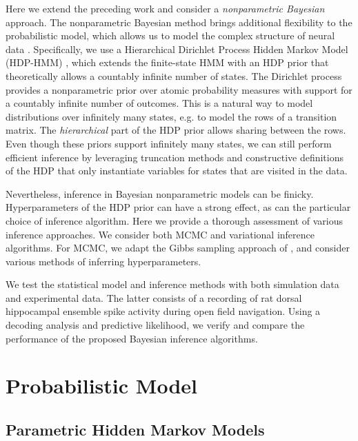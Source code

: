 Here we extend the preceding work and consider a {\em nonparametric
  Bayesian} approach.  The nonparametric Bayesian method brings
additional flexibility to the probabilistic model, which allows us to
model the complex structure of neural data
\citep{Teh10,Wood08,Shalchyan14}.  Specifically, we use a Hierarchical
Dirichlet Process Hidden Markov Model (HDP-HMM) \citep{Teh06}, which
extends the finite-state HMM with an HDP prior that theoretically
allows a countably infinite number of states.  The Dirichlet process
provides a nonparametric prior over atomic probability measures with
support for a countably infinite number of outcomes. This is a natural
way to model distributions over infinitely many states, e.g. to model
the rows of a transition matrix.  The \emph{hierarchical} part of the
HDP prior allows sharing between the rows. Even though these priors
support infinitely many states, we can still perform efficient
inference by leveraging truncation methods and constructive
definitions of the HDP that only instantiate variables for states that
are visited in the data.

Nevertheless, inference in Bayesian nonparametric models can be
finicky.  Hyperparameters of the HDP prior can have a strong effect,
as can the particular choice of inference algorithm. Here we provide a
thorough assessment of various inference approaches. We consider both
MCMC and variational inference algorithms. For MCMC, we adapt the
Gibbs sampling approach of \citep{Teh06}, and consider various methods
of inferring hyperparameters.

We test the statistical model and inference methods with both
simulation data and experimental data. The latter consists of a
recording of rat dorsal hippocampal ensemble spike activity during
open field navigation. Using a decoding analysis and predictive
likelihood, we verify and compare the performance of the proposed
Bayesian inference algorithms. 

\section{Probabilistic Model}

\subsection{Parametric Hidden Markov Models} 


